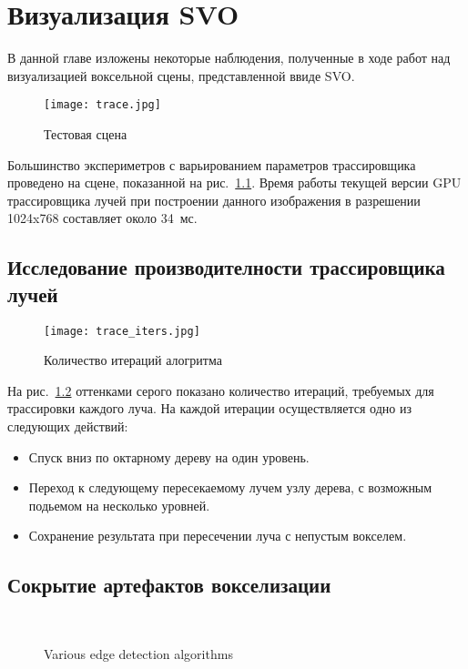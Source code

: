 \chapter{Визуализация SVO}

В данной главе изложены некоторые наблюдения, полученные в ходе работ над визуализацией воксельной сцены, представленной ввиде SVO.

\begin{figure}[ht]
\center
\texttt{[image: trace.jpg]}
\caption{Тестовая сцена}
\label{fig:trace}
\end{figure}

Большинство экспериметров с варьированием параметров трассировщика проведено на сцене, показанной на рис.~\ref{fig:trace}. Время работы текущей версии GPU трассировщика лучей при построении данного изображения в разрешении 1024x768 составляет около 34~мс. 

\section{Исследование производителности трассировщика лучей}

\begin{figure}[ht]
\center
\texttt{[image: trace\_iters.jpg]}
\caption{Количество итераций алогритма }
\label{fig:trace_iters}
\end{figure}

На рис.~\ref{fig:trace_iters} оттенками серого показано количество итераций, требуемых для трассировки каждого луча. На каждой итерации осуществляется одно из следующих действий:

\begin{itemize}
  \item Спуск вниз по октарному дереву на один уровень.
  \item Переход к следующему пересекаемому лучем узлу дерева, с возможным подьемом на несколько уровней.
  \item Сохранение результата при пересечении луча с непустым вокселем.
\end{itemize}


\section{Сокрытие артефактов вокселизации}

\begin{figure}[htp]
  \begin{center}
     \\
  \end{center}
  \caption{Various edge detection algorithms}
  \label{fig:edge}
\end{figure}
